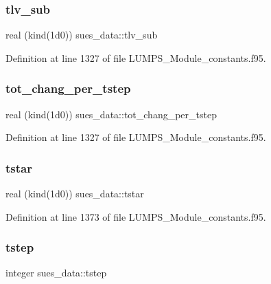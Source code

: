 \subsubsection{\texorpdfstring{tlv\+\_\+sub}{tlv\_sub}}
{\footnotesize\ttfamily real (kind(1d0)) sues\+\_\+data\+::tlv\+\_\+sub}



Definition at line 1327 of file L\+U\+M\+P\+S\+\_\+\+Module\+\_\+constants.\+f95.

\mbox{\label{namespacesues__data_a82ac11b95b008fb43921aac3b503efad}} 
\subsubsection{\texorpdfstring{tot\+\_\+chang\+\_\+per\+\_\+tstep}{tot\_chang\_per\_tstep}}
{\footnotesize\ttfamily real (kind(1d0)) sues\+\_\+data\+::tot\+\_\+chang\+\_\+per\+\_\+tstep}



Definition at line 1327 of file L\+U\+M\+P\+S\+\_\+\+Module\+\_\+constants.\+f95.

\mbox{\label{namespacesues__data_a6d0dd8d535aa36ca406b9c4ba99caef6}} 
\subsubsection{\texorpdfstring{tstar}{tstar}}
{\footnotesize\ttfamily real (kind(1d0)) sues\+\_\+data\+::tstar}



Definition at line 1373 of file L\+U\+M\+P\+S\+\_\+\+Module\+\_\+constants.\+f95.

\mbox{\label{namespacesues__data_ac6af955be55f5fe026b4ba1ab6ec480e}} 
\subsubsection{\texorpdfstring{tstep}{tstep}}
{\footnotesize\ttfamily integer sues\+\_\+data\+::tstep}



